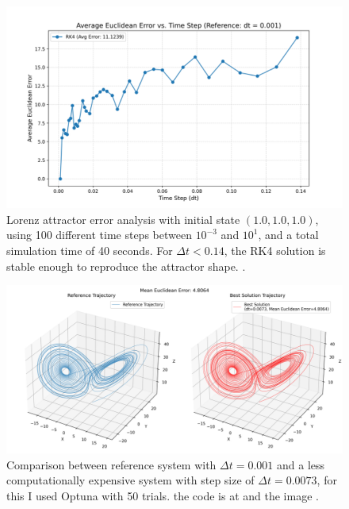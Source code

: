 \begin{figure}[!ht]
  \centering
  \includegraphics[width=0.9\linewidth]{images/error_comparison_rk4_stable_0.13.png}
  \caption{Lorenz attractor error analysis with initial state \((1.0, 1.0, 1.0)\), using 100 different time steps between \(10^{-3}\) and \(10^{1}\), and a total simulation time of 40 seconds. For \(\Delta t < 0.14\), the RK4 solution is stable enough to  reproduce the attractor shape. \cite{youngaryanerror_comparison_rk4_stable_0.13sCode}.}
  \label{fig:error_comparison_rk4_stable_0.13}
\end{figure}

\begin{figure}[!ht]
  \centering
  \includegraphics[width=0.9\linewidth]{images/optuna_lorenz_3d.png}
  \caption{Comparison between reference system with \(\Delta t = 0.001\) and a less computationally expensive system with step size of \(\Delta t = 0.0073\), for this I used Optuna \cite{akiba2019optuna} with 50 trials. the code is at \cite{youngaryanOptunaCode} and the image \cite{youngaryanoptunaComparisonImage}.}
  \label{fig:optuna_lorenz_3d}
\end{figure}


